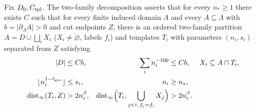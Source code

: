 \begin{definition}
    \label{def:area_law_two_family_decomposition}
    \leanok
    Fix $D_0,C_{\rm tpl}$. The two-family decomposition
    \cite[Proposition~11.2]{OpenAI2026AreaLaw} asserts that for every $n_*\ge1$
    there exists $C$ such that for every finite induced domain $\Lambda$ and
    every $A\subseteq\Lambda$ with $b=|\partial_\Lambda A|>0$ and cut endpoints
    $Z$, there is an ordered two-family partition
    $A=D\mathbin{\dot\cup}\bigsqcup_i X_i$ ($X_i\ne\varnothing$, labels $f_i$)
    and templates $T_i$ with parameters $(n_i,s_i)$ separated from $Z$ satisfying
    \begin{align}
        |D|                                   & \le Cb,                    &
        \sum_in_i^{-100}                      & \le Cb,                    &
        X_i                                   & \subseteq A\cap T_i,\notag          \\
        \lfloor n_i^{1-\ell_{\rm geo}}\rfloor & \le s_i,                   &
        n_i                                   & \ge n_*,                   & \notag \\
        \operatorname{dist}_\infty(T_i,Z)     & >2n_i^\beta,               &
        \operatorname{dist}_\infty\Bigl(T_i,
        \bigcup_{j<i,\,f_j=f_i}X_j\Bigr)      & >2n_i^\beta.\notag
    \end{align}
\end{definition}

